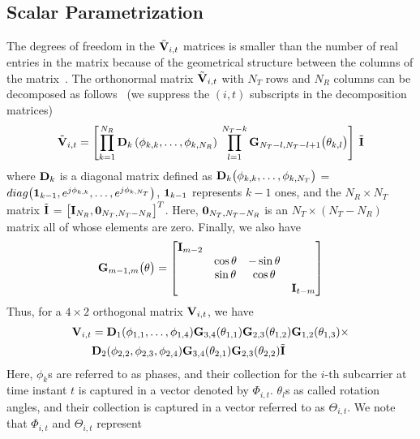 \documentclass[journal,10pt,twocolumn]{IEEEtran}
\def\bD{{\bf D}}
\def\bG{{\bf G}}
\def\bI{{\bf I}}
\def\bV{{\bf V}}
\begin{document}
\subsection{Scalar Parametrization}
\label{givens}
The degrees of freedom in the $\tilde{\bV}_{i,t}$ matrices is smaller
than the number of real entries in the matrix because of the
geometrical structure between the columns of the
matrix~\cite{4114278}. The orthonormal matrix $\tilde{\bV}_{i,t}$ with
$N_T$ rows and $N_R$ columns can be decomposed as follows~\cite{4114278} (we suppress
the $(i, t)$ subscripts in the decomposition matrices)
\begin{equation}
\tilde{\bV}_{i,t} = \left[\prod_{k=1}^{N_{R}} \bD_{k} \left( \phi_{k,k},\ldots , \phi_{k,N_{R}} \right) \:  \prod_{l=1}^{N_{T}-k} \bG_{N_{T}-l,N_{T} -l+1} \big( \theta_{k,l}\big)  \right] \: \tilde{\bI}
\end{equation}
where $\bD_{k}$ is a diagonal matrix defined as
$\bD_{k}\big(\phi_{k,k}, \ldots, \phi_{k,N_T } \big)$ =
$\mbox{diag}\big( {\bf 1}_{k-1}, e^{j\phi_{k,k}},\ldots,
e^{j\phi_{k,N_T }} \big)$, ${\bf 1}_{k-1}$ represents $k-1$ ones,
and the $N_R \times N_T$ matrix $\tilde{\bI}$ =
$\big[\bI_{N_R }, {\bf 0}_{N_T ,N_T -N_R}\big]^{T}$. Here,
${\bf 0}_{N_T ,N_T -N_R }$ is an $N_T\times (N_T - N_R)$ matrix all of
whose elements are zero. Finally, we also have
\begin{equation}
\bG_{m-1,m}\big(\theta\big)  =
\begin{bmatrix}
\bI_{m-2} & & & \\
& \cos\theta & -\sin\theta & \\
& \sin\theta & \cos\theta & \\
& & & \bI_{t-m}
\end{bmatrix}
\end{equation}
Thus, for a $4 \times 2$ orthogonal matrix $\bV_{i,t}$, we have
\begin{align*}
  \bV_{i,t} & =
  \bD_{1}(\phi_{1,1},\ldots,\phi_{1,4})\bG_{3,4}(\theta_{1,1})
  \bG_{2,3}(\theta_{1,2}) \bG_{1,2}(\theta_{1,3})\times\\
& \bD_{2}(\phi_{2,2},\phi_{2,3},\phi_{2,4}) \bG_{3,4}(\theta_{2,1}) \bG_{2,3}(\theta_{2,2})\tilde{\bI}
\end{align*}
Here, $\phi_{k}$s are referred to as phases, and their collection for
the $i$-th subcarrier at time instant $t$ is captured in a vector
denoted by $\Phi_{i,t}$. $\theta_{l}$s as called rotation angles, and
their collection is captured in a vector referred to as
$\Theta_{i,t}$. We note that $\Phi_{i,t}$ and $\Theta_{i,t}$ represent
\end{document}

